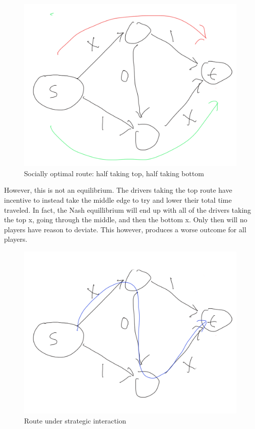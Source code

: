 \documentclass[12pt,twoside]{reedthesis}
\begin{document}
\begin{figure}[h!]
	\centering
	\includegraphics[scale=0.4]{braess_2}
	\caption{Socially optimal route: half taking top, half taking bottom}
	\label{braess2}
\end{figure}

However, this is not an equilibrium. The drivers taking the top route have incentive to instead take the middle edge to try and lower their total time traveled. In fact, the Nash equillibrium will end up with all of the drivers taking the top x, going through the middle, and then the bottom x. Only then will no players have reason to deviate. This however, produces a worse outcome for all players. 

\begin{figure}[h!]
	\centering
	\includegraphics[scale=0.4]{braess_3}
	\caption{Route under strategic interaction}
	\label{braess3}
\end{figure}
\end{document}
